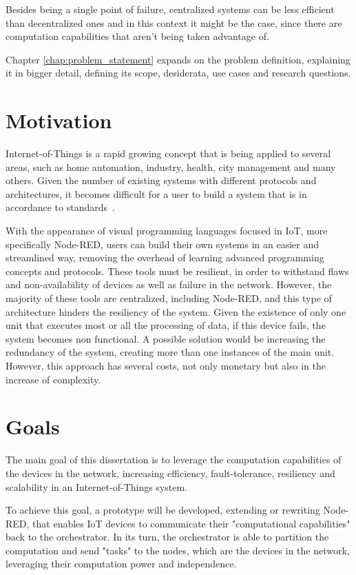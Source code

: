 Besides being a single point of failure, centralized systems can be less efficient than decentralized ones and in this context it might be the case, since there are computation capabilities that aren't being taken advantage of.

Chapter \ref{chap:problem_statement} expands on the problem definition, explaining it in bigger detail, defining its scope, desiderata, use cases and research questions.

\section{Motivation} \label{sec:motivation}

Internet-of-Things is a rapid growing concept that is being applied to several areas, such as home automation, industry, health, city management and many others. Given the number of existing systems with different protocols and architectures, it becomes difficult for a user to build a system that is in accordance to standards~\cite{standard-iot}. 

With the appearance of visual programming languages focused in IoT, more specifically Node-RED, users can build their own systems in an easier and streamlined way, removing the overhead of learning advanced programming concepts and protocols. These tools must be resilient, in order to withstand flaws and non-availability of devices as well as failure in the network. However, the majority of these tools are centralized, including Node-RED, and this type of architecture hinders the resiliency of the system. Given the existence of only one unit that executes most or all the processing of data, if this device fails, the system becomes non functional. A possible solution would be increasing the redundancy of the system, creating more than one instances of the main unit. However, this approach has several costs, not only monetary but also in the increase of complexity.

\section{Goals} \label{sec:goals}

The main goal of this dissertation is to leverage the computation capabilities of the devices in the network, increasing efficiency, fault-tolerance, resiliency and scalability in an Internet-of-Things system.

To achieve this goal, a prototype will be developed, extending or rewriting Node-RED, that enables IoT devices to communicate their "computational capabilities" back to the orchestrator. In its turn, the orchestrator is able to partition the computation and send "tasks" to the nodes, which are the devices in the network, leveraging their computation power and independence.


